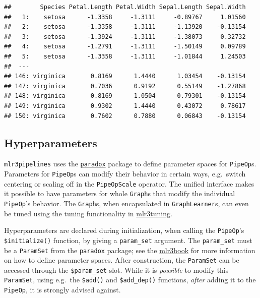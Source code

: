 \documentclass[]{scrbook}
\begin{document}
\begin{verbatim}
##        Species Petal.Length Petal.Width Sepal.Length Sepal.Width
##   1:    setosa      -1.3358     -1.3111     -0.89767     1.01560
##   2:    setosa      -1.3358     -1.3111     -1.13920    -0.13154
##   3:    setosa      -1.3924     -1.3111     -1.38073     0.32732
##   4:    setosa      -1.2791     -1.3111     -1.50149     0.09789
##   5:    setosa      -1.3358     -1.3111     -1.01844     1.24503
##  ---                                                            
## 146: virginica       0.8169      1.4440      1.03454    -0.13154
## 147: virginica       0.7036      0.9192      0.55149    -1.27868
## 148: virginica       0.8169      1.0504      0.79301    -0.13154
## 149: virginica       0.9302      1.4440      0.43072     0.78617
## 150: virginica       0.7602      0.7880      0.06843    -0.13154
\end{verbatim}

\hypertarget{ext-pipe-hyperpars}{%
\subsection{Hyperparameters}\label{ext-pipe-hyperpars}}

\texttt{mlr3pipelines} uses the \href{https://paradox.mlr-org.com}{\texttt{paradox}} package to define parameter spaces for \texttt{PipeOp}s.
Parameters for \texttt{PipeOp}s can modify their behavior in certain ways, e.g.~switch centering or scaling off in the \texttt{PipeOpScale} operator.
The unified interface makes it possible to have parameters for whole \texttt{Graph}s that modify the individual \texttt{PipeOp}'s behavior.
The \texttt{Graph}s, when encapsulated in \texttt{GraphLearner}s, can even be tuned using the tuning functionality in \href{https://mlr3tuning.mlr-org.com}{mlr3tuning}.

Hyperparameters are declared during initialization, when calling the \texttt{PipeOp}'s \texttt{\$initialize()} function, by giving a \texttt{param\_set} argument.
The \texttt{param\_set} must be a \texttt{ParamSet} from the \texttt{paradox} package; see the \href{https://mlr3book.mlr-org.com}{mlr3book} for more information on how to define parameter spaces.
After construction, the \texttt{ParamSet} can be accessed through the \texttt{\$param\_set} slot.
While it is \emph{possible} to modify this \texttt{ParamSet}, using e.g.~the \texttt{\$add()} and \texttt{\$add\_dep()} functions, \emph{after} adding it to the \texttt{PipeOp}, it is strongly advised against.
\end{document}
